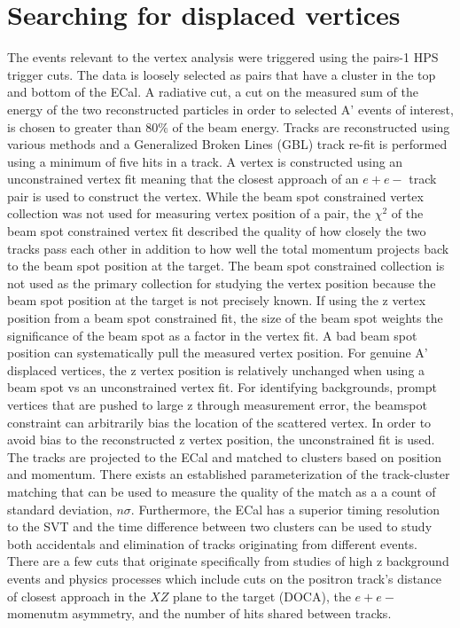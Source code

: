 \documentclass[12pt]{report}
\begin{document}
\chapter{Searching for displaced vertices}
The events relevant to the vertex analysis were triggered using the pairs-1 HPS trigger cuts. The data is loosely selected as pairs that have a cluster in the top and bottom of the ECal. A radiative cut, a cut on the measured sum of the energy of the two reconstructed particles in order to selected A' events of interest, is chosen to greater than 80$\%$ of the beam energy. Tracks are reconstructed using various methods and a Generalized Broken Lines (GBL) track re-fit is performed using a minimum of five hits in a track. A vertex is constructed using an unconstrained vertex fit meaning that the closest approach of an $e+e-$ track pair is used to construct the vertex. While the beam spot constrained vertex collection was not used for measuring vertex position of a pair, the $\chi^{2}$ of the beam spot constrained vertex fit described the quality of how closely the two tracks pass each other in addition to how well the total momentum projects back to the beam spot position at the target. 
\indent The beam spot constrained collection is not used as the primary collection for studying the vertex position because the beam spot position at the target is not precisely known. If using the z vertex position from a beam spot constrained fit, the size of the beam spot weights the significance of the beam spot as a factor in the vertex fit. A bad beam spot position can systematically pull the measured vertex position. For genuine A' displaced vertices, the z vertex position  is relatively unchanged when using a beam spot vs an unconstrained vertex fit. For identifying backgrounds, prompt vertices that are pushed to large z through measurement error, the beamspot constraint can arbitrarily bias the location of the scattered vertex. In order to avoid bias to the reconstructed z vertex position, the unconstrained fit is used.  \\
\indent The tracks are projected to the ECal and matched to clusters based on position and momentum. There exists an established parameterization of the track-cluster matching that can be used to measure the quality of the match as a a count of standard deviation, $n\sigma$. Furthermore, the ECal has a superior timing resolution to the SVT and the time difference between two clusters can be used to study both accidentals and elimination of tracks originating from different events. \\
\indent There are a few cuts that originate specifically from studies of high z background events and physics processes which include cuts on the positron track's distance of closest approach in the $XZ$ plane to the target (DOCA), the $e+e-$ momenutm asymmetry, and the number of hits shared between tracks. 
\end{document}
